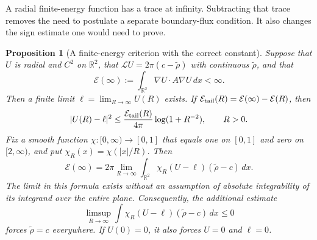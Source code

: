 \documentclass[11pt,a4paper]{article}
\numberwithin{equation}{section}
\newtheorem{proposition}[theorem]{Proposition}
\theoremstyle{definition}
\theoremstyle{remark}
\begin{document}
A radial finite-energy function has a trace at infinity.  Subtracting
that trace removes the need to postulate a separate boundary-flux
condition.  It also changes the sign estimate one would need to prove.

\begin{proposition}[A finite-energy criterion with the correct constant]
\label{prop:screening-energy-trace-criterion}
Suppose that $U$ is radial and $C^2$ on $\mathbb R^2$, that
$\mathcal LU=2\pi(c-\widetilde\rho)$ with continuous
$\widetilde\rho$, and that
\[
 \mathcal E(\infty):=\int_{\mathbb R^2}\nabla U\cdot A\nabla U\,dx
 <\infty.
\]
Then a finite limit $\ell=\lim_{R\to\infty}U(R)$ exists.  If
$\mathcal E_{\rm tail}(R)=\mathcal E(\infty)-\mathcal E(R)$, then
\begin{equation}
 |U(R)-\ell|^2\le
 \frac{\mathcal E_{\rm tail}(R)}{4\pi}
          \log(1+R^{-2}),\qquad R>0.
 \label{eq:screening-finite-energy-trace}
\end{equation}
Fix a smooth function $\chi:[0,\infty)\to[0,1]$ that equals one
on $[0,1]$ and zero on $[2,\infty)$, and put
$\chi_R(x)=\chi(|x|/R)$.  Then
\begin{equation}
 \mathcal E(\infty)=2\pi\lim_{R\to\infty}
       \int_{\mathbb R^2}\chi_R(U-\ell)
                         (\widetilde\rho-c)\,dx.
 \label{eq:screening-renormalized-energy-identity}
\end{equation}
The limit in this formula exists without an assumption of absolute
integrability of its integrand over the entire plane.  Consequently,
the additional estimate
\begin{equation}
 \limsup_{R\to\infty}\int\chi_R(U-\ell)
                         (\widetilde\rho-c)\,dx\le0
 \label{eq:screening-renormalized-sign-criterion}
\end{equation}
forces $\widetilde\rho=c$ everywhere.  If $U(0)=0$, it also forces
$U=0$ and $\ell=0$.
\end{proposition}
\end{document}
